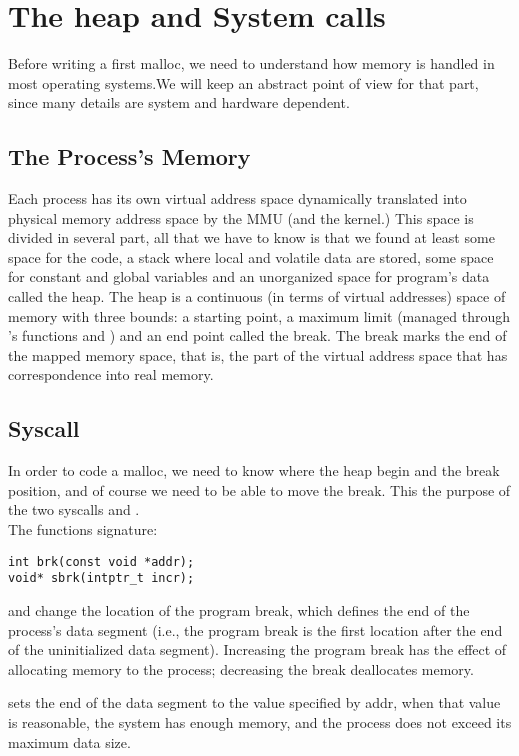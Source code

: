 \section{The heap and System calls}
Before writing a first malloc, we need to understand how memory is handled in most operating systems.We will keep an abstract point of view for that part, since many details are system and
hardware dependent.

\subsection{The Process’s Memory}
Each process has its own virtual address space dynamically translated into physical memory  address space by the MMU (and the kernel.) This space is divided in several part, all that we have to know is that we found at least some space for the code, a stack where local and volatile data are stored, some space for constant and global variables and an unorganized space for program’s data called the heap.
The heap is a continuous (in terms of virtual addresses) space of memory with three bounds: a starting point, a maximum limit (managed through ’s functions  and ) and an end point called the break. The break marks the end of the mapped memory space, that is, the part of the virtual address space that has correspondence into real memory. 

\subsection{Syscall}
In order to code a malloc, we need to know where the heap begin and the break position,
and of course we need to be able to move the break. This the purpose of the two syscalls  and .\\
The functions signature:
\begin{lstlisting}
int brk(const void *addr);
void* sbrk(intptr_t incr);
\end{lstlisting}
 and  change the location of the program break, which defines the end of the process's data segment (i.e., the program break is the first location after the end of the uninitialized data segment). Increasing the program break has the effect of allocating memory to the process; decreasing the break deallocates memory.

 sets the end of the data segment to the value specified by addr, when that value is reasonable, the system has enough memory, and the process does not exceed its maximum data size.

